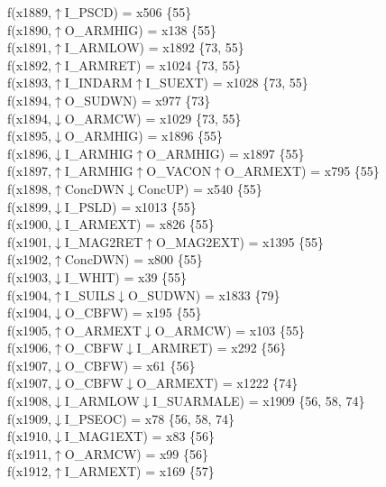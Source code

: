 f(x1889,$\uparrow$I\_PSCD) = x506 \{55\} \\  
f(x1890,$\uparrow$O\_ARMHIG) = x138 \{55\} \\  
f(x1891,$\uparrow$I\_ARMLOW) = x1892 \{73, 55\} \\  
f(x1892,$\uparrow$I\_ARMRET) = x1024 \{73, 55\} \\  
f(x1893,$\uparrow$I\_INDARM$\uparrow$I\_SUEXT) = x1028 \{73, 55\} \\  
f(x1894,$\uparrow$O\_SUDWN) = x977 \{73\} \\  
f(x1894,$\downarrow$O\_ARMCW) = x1029 \{73, 55\} \\  
f(x1895,$\downarrow$O\_ARMHIG) = x1896 \{55\} \\  
f(x1896,$\downarrow$I\_ARMHIG$\uparrow$O\_ARMHIG) = x1897 \{55\} \\  
f(x1897,$\uparrow$I\_ARMHIG$\uparrow$O\_VACON$\uparrow$O\_ARMEXT) = x795 \{55\} \\  
f(x1898,$\uparrow$ConcDWN$\downarrow$ConcUP) = x540 \{55\} \\  
f(x1899,$\downarrow$I\_PSLD) = x1013 \{55\} \\  
f(x1900,$\downarrow$I\_ARMEXT) = x826 \{55\} \\  
f(x1901,$\downarrow$I\_MAG2RET$\uparrow$O\_MAG2EXT) = x1395 \{55\} \\  
f(x1902,$\uparrow$ConcDWN) = x800 \{55\} \\  
f(x1903,$\downarrow$I\_WHIT) = x39 \{55\} \\  
f(x1904,$\uparrow$I\_SUILS$\downarrow$O\_SUDWN) = x1833 \{79\} \\  
f(x1904,$\downarrow$O\_CBFW) = x195 \{55\} \\  
f(x1905,$\uparrow$O\_ARMEXT$\downarrow$O\_ARMCW) = x103 \{55\} \\  
f(x1906,$\uparrow$O\_CBFW$\downarrow$I\_ARMRET) = x292 \{56\} \\  
f(x1907,$\downarrow$O\_CBFW) = x61 \{56\} \\  
f(x1907,$\downarrow$O\_CBFW$\downarrow$O\_ARMEXT) = x1222 \{74\} \\  
f(x1908,$\downarrow$I\_ARMLOW$\downarrow$I\_SUARMALE) = x1909 \{56, 58, 74\} \\  
f(x1909,$\downarrow$I\_PSEOC) = x78 \{56, 58, 74\} \\  
f(x1910,$\downarrow$I\_MAG1EXT) = x83 \{56\} \\  
f(x1911,$\uparrow$O\_ARMCW) = x99 \{56\} \\  
f(x1912,$\uparrow$I\_ARMEXT) = x169 \{57\} \\  
